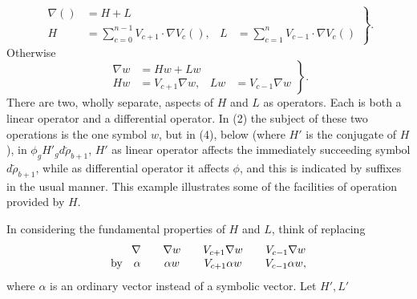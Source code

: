 \documentclass[11pt]{article}
\begin{document}
\begin{equation}\left.\begin{aligned}\nabla()&=H+L\\H&=\sum_{c=0}^{n-1}V_{c+1}\cdot\nabla V_c(),&L&=\sum_{c=1}^{n}V_{c-1}\cdot\nabla V_c()\end{aligned}\right\}.\tag{1}\end{equation}
Otherwise
\begin{equation}\left.\begin{aligned}\nabla w&=Hw+Lw\\Hw&=V_{c+1}\nabla w,&Lw&=V_{c-1}\nabla w\end{aligned}\right\}.\tag{2}\end{equation}
There are two, wholly separate, aspects of $H$ and $L$ as operators. Each is both a linear operator and a differential operator. In (2) the subject of these two operations is the one symbol $w$, but in (4), below (where $H'$ is the conjugate of $H$), in $\phi_gH'_gd\breve\rho_{b+1}$, $H'$ as linear operator affects the immediately succeeding symbol $d\breve\rho_{b+1}$, while as differential operator it affects $\phi$, and this is indicated by suffixes in the usual manner. This example illustrates some of the facilities of operation provided by $H$.

\indent In considering the fundamental properties of $H$ and $L$, think of replacing
\[
\begin{array}{r@{\qquad}c@{\qquad}c@{\qquad}c}
  \nabla & \nabla w & V_{c+1}\nabla w & V_{c-1}\nabla w \\
  \text{by}\quad\alpha & \alpha w & V_{c+1}\alpha w & V_{c-1}\alpha w,
\end{array}
\]
where $\alpha$ is an ordinary vector instead of a symbolic vector. Let $H',L'$
\end{document}
